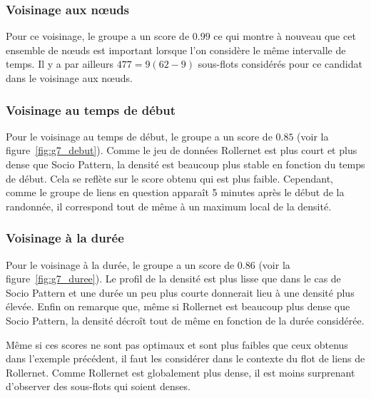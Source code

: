 \subsubsection*{Voisinage aux n\oe{}uds}
Pour ce voisinage, le groupe a un score de $0.99$ ce qui montre à nouveau que cet ensemble de n\oe{}uds est important lorsque l'on considère le même intervalle de temps.
Il y a par ailleurs $477=9(62-9)$ sous-flots considérés pour ce candidat dans le voisinage aux n\oe{}uds.

\subsubsection*{Voisinage au temps de début}
Pour le voisinage au temps de début, le groupe a un score de $0.85$ (voir la figure~\ref{fig:g7_debut}).
Comme le jeu de données Rollernet est plus court et plus dense que Socio Pattern, la densité est beaucoup plus stable en fonction du temps de début.
Cela se reflète sur le score obtenu qui est plus faible.
Cependant, comme le groupe de liens en question apparaît 5 minutes après le début de la randonnée, il correspond tout de même à un maximum local de la densité.


\subsubsection*{Voisinage à la durée}
Pour le voisinage à la durée, le groupe a un score de $0.86$ (voir la figure~\ref{fig:g7_duree}).
Le profil de la densité est plus lisse que dans le cas de Socio Pattern et une durée un peu plus courte donnerait lieu à une densité plus élevée. 
Enfin on remarque que, même si Rollernet est beaucoup plus dense que Socio Pattern, la densité décroît tout de même en fonction de la durée considérée.

\bigskip

Même si ces scores ne sont pas optimaux et sont plus faibles que ceux obtenus dans l'exemple précédent, il faut les considérer dans le contexte du flot de liens de Rollernet.
Comme Rollernet est globalement plus dense, il est moins surprenant d'observer des sous-flots qui soient denses.
 

